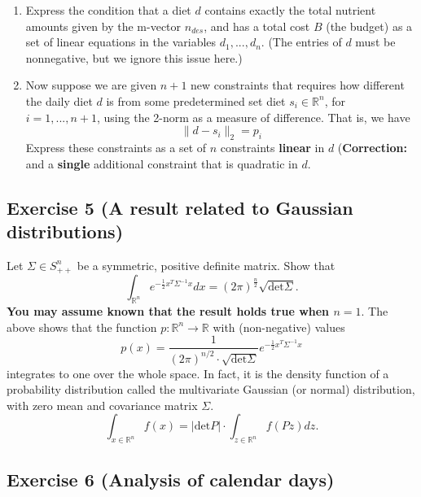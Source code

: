 \documentclass[11pt]{article}
\begin{document}
\begin{enumerate}
    \item Express the condition that a diet $d$ contains exactly the total nutrient amounts given by the m-vector $n_{des}$, and has a total cost $B$ (the budget) as a set of linear equations in the variables $d_1, ..., d_n$. (The entries of $d$ must be nonnegative, but we ignore this issue here.)

    \item Now suppose we are given $n + 1$ new constraints that requires how different the daily diet $d$ is from some predetermined set diet $s_i \in \mathbb{R}^n$, for $i = 1, ..., n+1$, using the 2-norm as a measure of difference. That is, we have
    $$
    \| d - s_i \|_2 = p_i
    $$
    Express these constraints as a set of $n$ constraints \textbf{linear} in $d$ (\textbf{Correction:} and a \textbf{single} additional constraint that is quadratic in $d$.
\end{enumerate}

\begin{solution}
\end{solution}

\newpage
\subsection*{Exercise 5 (A result related to Gaussian distributions)}

Let $\Sigma \in S^n_{++}$ be a symmetric, positive definite matrix. Show that
$$
\int_{\mathbb{R}^n} e^{-\frac{1}{2}x^T \Sigma^{-1} x} dx
= (2 \pi)^{\frac{n}{2}} \sqrt{\text{det} \Sigma}.
$$
\textbf{You may assume known that the result holds true when $n = 1$}. The above shows that the function $p : \mathbb{R}^n \rightarrow \mathbb{R}$ with (non-negative) values
$$
p(x) = \frac{1}{(2\pi)^{n/2} \cdot \sqrt{\text{det} \Sigma}} e^{-\frac{1}{2} x^T \Sigma^{-1} x}
$$
integrates to one over the whole space. In fact, it is the density function of a probability distribution called the multivariate Gaussian (or normal) distribution, with zero mean and covariance matrix $\Sigma$.
$$
\int_{x \in \mathbb{R}^n} f(x)
=
|\text{det} P| \cdot \int_{z \in \mathbb{R}^n} f(Pz) dz.
$$

\begin{solution}
\end{solution}

\newpage
\subsection*{Exercise 6 (Analysis of calendar days)}
\end{document}

